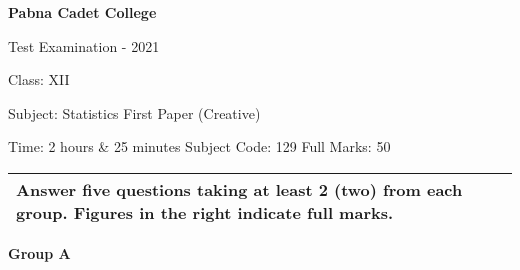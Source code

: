 \documentclass{article}
\begin{document}
\begin{center}
  \bfseries\large
  Pabna Cadet College

\normalsize
  Test Examination - 2021

  Class: XII

  Subject: Statistics First Paper (Creative)

  Time: 2 hours \& 25 minutes \qquad \qquad Subject Code: 129  \qquad  \qquad Full Marks: 50

\end{center}

\noindent
\begin{tabular}{p{\dimexpr\linewidth-2\tabcolsep}}
  Answer five questions taking at least 2 (two) from each group. Figures in the right indicate full marks.\\
  \hline
\end{tabular}

\begin{center}
\textbf{Group A}
\end{center}
\end{document}
